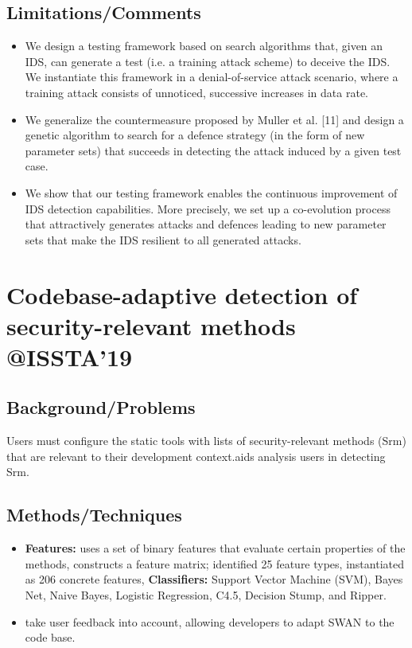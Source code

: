 \subsection{Limitations/Comments}
\begin{itemize}
	\item We design a testing framework based on search algorithms that, given an IDS, can generate a test (i.e. a training attack scheme) to deceive the IDS. We instantiate this framework in a denial-of-service attack scenario, where a training attack consists of unnoticed, successive increases in data rate. 
	\item We generalize the countermeasure proposed by Muller et al. [11] and design a genetic algorithm to search for a defence strategy (in the form of new parameter sets) that succeeds in detecting the attack induced by a given test case.
	\item We show that our testing framework enables the continuous improvement of IDS detection capabilities. More precisely, we set up a co-evolution process that attractively generates attacks and defences leading to new parameter sets that make the IDS resilient to all generated attacks.
\end{itemize}
\newpage

\section{Codebase-adaptive detection of security-relevant methods \\@ISSTA'19}
\subsection{Background/Problems}
Users must configure the static tools with lists of security-relevant methods (Srm) that are relevant to their development context.aids analysis users in detecting Srm.
\subsection{Methods/Techniques}
\begin{itemize}
	\item \textbf{Features:} uses a set of binary features that evaluate certain properties of the methods, constructs a feature matrix; identified 25 feature types, instantiated as 206 concrete features, \textbf{Classifiers:} Support Vector Machine (SVM), Bayes Net, Naive Bayes, Logistic Regression, C4.5, Decision Stump, and Ripper.
	\item  take user feedback into account, allowing developers to adapt SWAN to the code base.
\end{itemize}

